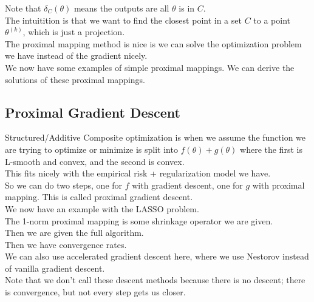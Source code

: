 \documentclass[12pt]{article}
\begin{document}
Note that $\delta_{C}(\theta)$
means the outputs are all $\theta$ is in $C$. \\

The intuitition is that we want to find the
closest point in a set $C$ to a point $\theta^{(k)}$,
which is just a projection. \\

The proximal mapping method is nice
is we can solve the optimization problem
we have instead of the gradient nicely. \\

We now have some examples of simple
proximal mappings. We can derive the solutions
of these proximal mappings. \\

\newpage

\subsection*{Proximal Gradient Descent}

Structured/Additive Composite optimization is 
when we assume the function we are trying
to optimize or minimize is split into
$f(\theta) + g(\theta)$
where the first is L-smooth and convex,
and the second is convex. \\

This fits nicely with the empirical risk
+ regularization model we have. \\

So we can do two steps, one for $f$
with gradient descent, one for $g$
with proximal mapping.
This is called proximal gradient descent. \\

We now have an example with the LASSO problem. \\
The 1-norm proximal mapping is 
some shrinkage operator we are given. \\

Then we are given the full algorithm. \\

Then we have convergence rates. \\

We can also use accelerated gradient descent 
here, where we use Nestorov instead of vanilla 
gradient descent. \\

Note that we don't call these
descent methods because there is no descent;
there is convergence, but not every step
gets us closer. \\
\end{document}
